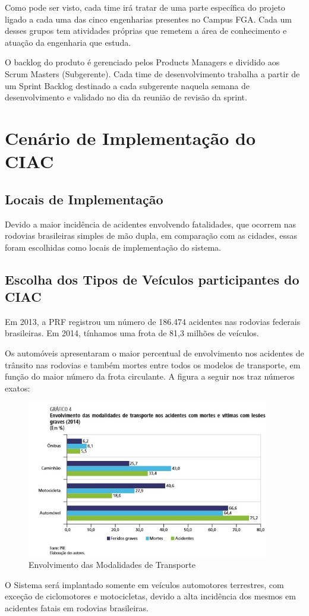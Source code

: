 Como pode ser visto, cada time irá tratar de uma  parte específica do projeto ligado a cada uma das cinco engenharias presentes no Campus FGA. Cada um desses grupos tem atividades próprias que remetem a área de conhecimento e atuação da engenharia que estuda.

O backlog do produto é gerenciado pelos Products Managers e dividido aos Scrum Masters (Subgerente). Cada time de desenvolvimento trabalha a partir de um Sprint Backlog destinado a cada subgerente naquela semana de desenvolvimento e validado no dia da reunião de revisão da sprint.


\section{Cenário de Implementação do CIAC}

\subsection{Locais de Implementação}

Devido a maior incidência de acidentes envolvendo fatalidades, que ocorrem nas rodovias brasileiras simples de mão dupla, em comparação com as cidades, essas foram escolhidas como locais de implementação do sistema.


\subsection{Escolha dos Tipos de Veículos participantes do CIAC}

Em 2013, a PRF registrou um número de 186.474 acidentes nas rodovias federais brasileiras. Em 2014, tínhamos uma frota de 81,3 milhões de veículos.

Os automóveis apresentaram o maior percentual de envolvimento nos acidentes de trânsito nas rodovias e também mortes entre todos os modelos de transporte, em função do maior número da frota circulante. A figura a seguir nos traz números exatos:

\begin{figure}[h]
  \centering
  \includegraphics[width=400px, scale=1]{figuras/niveisacidente}
  \caption{Envolvimento das Modalidades de Transporte}
\label{fig:time}
\end{figure}

O Sistema será implantado somente em veículos automotores terrestres, com exceção de ciclomotores e motocicletas, devido a alta incidência dos mesmos em acidentes fatais em rodovias brasileiras.
